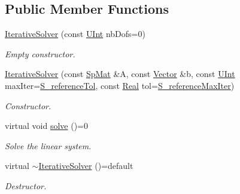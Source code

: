 \subsection*{Public Member Functions}
\begin{DoxyCompactItemize}
\item 
\hyperlink{classFVCode3D_1_1IterativeSolver_a01c30f14a0cc4eb2198abcc2e55ac17d}{Iterative\+Solver} (const \hyperlink{namespaceFVCode3D_a4bf7e328c75d0fd504050d040ebe9eda}{U\+Int} nb\+Dofs=0)
\begin{DoxyCompactList}\small\item\em Empty constructor. \end{DoxyCompactList}\item 
\hyperlink{classFVCode3D_1_1IterativeSolver_a16b635ed663e7cd5b18c1d25a45b7fd4}{Iterative\+Solver} (const \hyperlink{namespaceFVCode3D_ac1032289d96638cf0ad6c52ef639095f}{Sp\+Mat} \&A, const \hyperlink{namespaceFVCode3D_a16ccf345652402bccd1a5d2e6782526c}{Vector} \&b, const \hyperlink{namespaceFVCode3D_a4bf7e328c75d0fd504050d040ebe9eda}{U\+Int} max\+Iter=\hyperlink{classFVCode3D_1_1IterativeSolver_a2afd68f254311907309444138d7f1b89}{S\+\_\+reference\+Tol}, const \hyperlink{namespaceFVCode3D_a40c1f5588a248569d80aa5f867080e83}{Real} tol=\hyperlink{classFVCode3D_1_1IterativeSolver_a938effdbfaa21c23226bfedf904787c2}{S\+\_\+reference\+Max\+Iter})
\begin{DoxyCompactList}\small\item\em Constructor. \end{DoxyCompactList}\item 
virtual void \hyperlink{classFVCode3D_1_1IterativeSolver_a4433b9ea4d26e19e7044ed4709ea7c4b}{solve} ()=0
\begin{DoxyCompactList}\small\item\em Solve the linear system. \end{DoxyCompactList}\item 
virtual \hyperlink{classFVCode3D_1_1IterativeSolver_a4cd117ba4225b844d32859192d8e9b44}{$\sim$\+Iterative\+Solver} ()=default
\begin{DoxyCompactList}\small\item\em Destructor. \end{DoxyCompactList}\end{DoxyCompactItemize}
